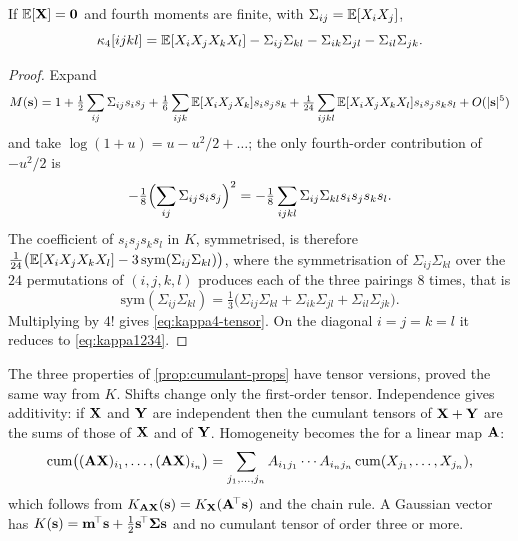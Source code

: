 \begin{lemma}
\label{lem:kappa4-tensor}
If $\mathbb{E}[\mathbf{X}]=\mathbf{0}$ and fourth moments are finite, with $\Sigma_{ij}=\mathbb{E}[X_iX_j]$,
\begin{equation}
  \kappa_4[ijkl]=\mathbb{E}[X_iX_jX_kX_l]-\Sigma_{ij}\Sigma_{kl}-\Sigma_{ik}\Sigma_{jl}-\Sigma_{il}\Sigma_{jk}.
  \label{eq:kappa4-tensor}
\end{equation}
\end{lemma}
\begin{proof}
Expand
\[
  M(\mathbf{s})=1+\tfrac12\sum_{ij}\Sigma_{ij}s_is_j+\tfrac16\sum_{ijk}\mathbb{E}[X_iX_jX_k]s_is_js_k
  +\tfrac1{24}\sum_{ijkl}\mathbb{E}[X_iX_jX_kX_l]s_is_js_ks_l+O(|\mathbf{s}|^5)
\]
and take $\log(1+u)=u-u^2/2+\dots$; the only fourth-order contribution of $-u^2/2$ is
\[
  -\tfrac18\Bigl(\sum_{ij}\Sigma_{ij}s_is_j\Bigr)^2=-\tfrac18\sum_{ijkl}\Sigma_{ij}\Sigma_{kl}s_is_js_ks_l .
\]
The coefficient of $s_is_js_ks_l$ in $K$, symmetrised, is therefore
$\tfrac1{24}\bigl(\mathbb{E}[X_iX_jX_kX_l]-3\,\mathrm{sym}(\Sigma_{ij}\Sigma_{kl})\bigr)$, where the
symmetrisation of $\Sigma_{ij}\Sigma_{kl}$ over the $24$ permutations of $(i,j,k,l)$
produces each of the three pairings $8$ times, that is
\[
  \mathrm{sym}(\Sigma_{ij}\Sigma_{kl})=\tfrac13\bigl(\Sigma_{ij}\Sigma_{kl}+\Sigma_{ik}\Sigma_{jl}+\Sigma_{il}\Sigma_{jk}\bigr).
\]
Multiplying by $4!$ gives \cref{eq:kappa4-tensor}. On the diagonal $i=j=k=l$ it
reduces to \cref{eq:kappa1234}.
\end{proof}

The three properties of \cref{prop:cumulant-props} have tensor versions, proved the
same way from $K$. Shifts change only the first-order tensor. Independence gives
additivity: if $\mathbf{X}$ and $\mathbf{Y}$ are independent then the cumulant tensors of
$\mathbf{X}+\mathbf{Y}$ are the sums of those of $\mathbf{X}$ and of $\mathbf{Y}$. Homogeneity
becomes the  for a linear map $\mathbf{A}$:
\begin{equation}
  \operatorname{cum}\bigl((\mathbf{A}\mathbf{X})_{i_1},\dots,(\mathbf{A}\mathbf{X})_{i_n}\bigr)
  =\sum_{j_1,\dots,j_n}A_{i_1j_1}\cdots A_{i_nj_n}\operatorname{cum}(X_{j_1},\dots,X_{j_n}),
  \label{eq:cum-transform}
\end{equation}
which follows from $K_{\mathbf{A}\mathbf{X}}(\mathbf{s})=K_{\mathbf{X}}(\mathbf{A}^{\!\top}\mathbf{s})$ and the
chain rule. A Gaussian vector has $K(\mathbf{s})=\mathbf{m}^{\!\top}\mathbf{s}+\tfrac12\mathbf{s}^{\!\top}\mathbf{\Sigma}\mathbf{s}$
and no cumulant tensor of order three or more.

